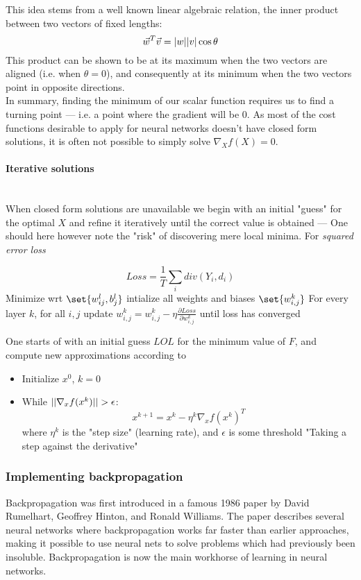 \documentclass[10pt, a4paper, twocolumn]{article}
\newcommand{\myparagraph}[1]{\paragraph{#1}\mbox{}\\}
\DeclarePairedDelimiter\abs{\lvert}{\rvert}%
\DeclarePairedDelimiter\set\{\}
\begin{document}
			This idea stems from a well known linear algebraic relation, the inner product between two vectors of fixed lengths:
				$$\vec{w}^T\vec{v}=\abs{w}\abs{v}\cos{\theta}$$
			This product can be shown to be at its maximum when the two vectors are aligned (i.e. when $\theta = 0$), and consequently at its minimum when the two vectors point in opposite directions.\\
			In summary, finding the minimum of our scalar function requires us to find a turning point --- i.e. a point where the gradient will be $0$. As most of the cost functions desirable to apply for neural networks doesn't have  closed form solutions, it is often not possible to simply solve $\nabla_X f(X)=0$.
			\myparagraph{Iterative solutions}
				When closed form solutions are unavailable we begin with an initial "guess" for the optimal $X$ and refine it iteratively until the correct value is obtained
				--- One should here however note the "risk" of discovering mere local minima.
				For \emph{squared error loss}
				
					$$Loss=\frac{1}{T}\sum_i div(Y_i,d_i)$$
				Minimize wrt $\set{w_{ij}^l,b_j^l}$
				intialize all weights and biases $\set{w_{i,j}^k}$
				For every layer $k$, for all $i,j$ update $w_{i,j}^k=w_{i,j}^k-\eta\frac{\partial Loss}{\partial w_{i,j}^k}$ until loss has converged
				
			One starts of with an initial guess $LOL$ for the minimum value of $F$, and compute new approximations according to
			\begin{itemize}
				\item Initialize $x^0$, $k=0$
				\item While $\abs{\abs{\nabla_x f(x^k)}}>\epsilon$:
				$$x^{k+1}=x^k-\eta^k \nabla_x f(x^k)^T$$
				where $\eta^k$ is the "step size" (learning rate), and $\epsilon$ is some threshold  "Taking a step against the derivative"
			\end{itemize}
		\subsubsection{Implementing backpropagation}
			Backpropagation was first introduced in a famous 1986 paper by David Rumelhart, Geoffrey Hinton, and Ronald Williams. The paper describes several neural networks where backpropagation works far faster than earlier approaches, making it possible to use neural nets to solve problems which had previously been insoluble. Backpropagation is now the main workhorse of learning in neural networks.\\\\
			
\end{document}

